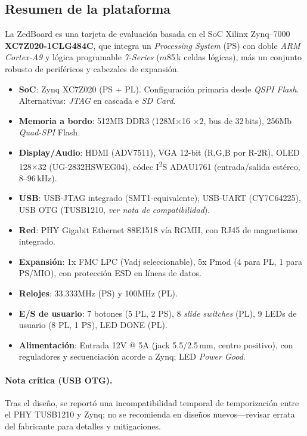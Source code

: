 \documentclass[a4paper,12pt]{article}
\begin{document}
\subsection{Resumen de la plataforma}
La ZedBoard es una tarjeta de evaluación basada en el SoC Xilinx Zynq--7000 \textbf{XC7Z020-1CLG484C}, que integra un \emph{Processing System} (PS) con doble \textit{ARM Cortex-A9} y lógica programable \emph{7-Series} (\(m\)85\,k celdas lógicas), más un conjunto robusto de periféricos y cabezales de expansión.

\begin{itemize}
  \item \textbf{SoC}: Zynq XC7Z020 (PS + PL). Configuración primaria desde \emph{QSPI Flash}. Alternativas: \emph{JTAG} en cascada e \emph{SD Card}.
  \item \textbf{Memoria a bordo}: {512}{MB} DDR3 (128M\(\times\)16 \(\times 2\), bus de 32\,bits), {256}{Mb} \emph{Quad-SPI} Flash. 
  \item \textbf{Display/Audio}: HDMI (ADV7511), VGA 12-bit (R,G,B por R-2R), OLED 128\(\times\)32 (UG-2832HSWEG04), códec I\textsuperscript{2}S ADAU1761 (entrada/salida estéreo, 8–96\,kHz). 
  \item \textbf{USB}: USB-JTAG integrado (SMT1-equivalente), USB-UART (CY7C64225), USB OTG (TUSB1210, \emph{ver nota de compatibilidad}).
  \item \textbf{Red}: PHY Gigabit Ethernet 88E1518 vía RGMII, con RJ45 de magnetismo integrado. 
  \item \textbf{Expansión}: 1x FMC LPC (Vadj seleccionable), 5x Pmod (4 para PL, 1 para PS/MIO), con protección ESD en líneas de datos. 
  \item \textbf{Relojes}: {33.333}{MHz} (PS) y {100}{MHz} (PL). 
  \item \textbf{E/S de usuario}: 7 botones (5 PL, 2 PS), 8 \emph{slide switches} (PL), 9 LEDs de usuario (8 PL, 1 PS), LED DONE (PL). 
  \item \textbf{Alimentación}: Entrada {12}{V} @ {5}{A} (jack 5.5/2.5\,mm, centro positivo), con reguladores y secuenciación acorde a Zynq; LED \emph{Power Good}. 
\end{itemize}

\paragraph{Nota crítica (USB OTG).}
Tras el diseño, se reportó una incompatibilidad temporal de temporización entre el PHY TUSB1210 y Zynq; no se recomienda en diseños nuevos—revisar errata del fabricante para detalles y mitigaciones.
\end{document}
